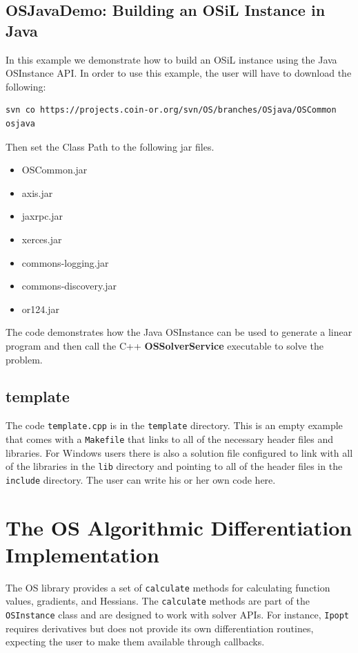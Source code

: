 \documentclass[11pt]{article}
\renewcommand{\_}{{\char"5F}}
\renewcommand{\{}{{\char"7B}}
\renewcommand{\}}{{\char"7D}}
\renewcommand{\^}{{\char"0D}}
\renewcommand{\'}{{\char"0D}}
\begin{document}
\begin{enumerate}[Step 1:]
\subsection{OSJavaDemo:  Building an OSiL Instance in Java}\label{section:exampleOSJavaDemo}

In this example we demonstrate how to build an OSiL instance using the Java OSInstance API. In order to use this example, the user will have to download the following:

\begin{verbatim}
svn co https://projects.coin-or.org/svn/OS/branches/OSjava/OSCommon osjava
\end{verbatim}
Then set the Class Path to the following jar files.
\begin{itemize}
\item OSCommon.jar
\item axis.jar
\item jaxrpc.jar
\item xerces.jar
\item commons-logging.jar
\item commons-discovery.jar
\item or124.jar
\end{itemize}
The code demonstrates how the Java OSInstance can be used to generate a linear program and then call the  
C++ {  \bf OSSolverService} executable to solve the problem.



\subsection{template}\label{section:exampleTemplate} The code {\tt template.cpp} is in the {\tt template} 
directory.  This is an empty example that comes with a {\tt Makefile}  that links to all of the necessary 
header files and libraries. For Windows users there is also a solution file configured to link with all
of the libraries in the {\tt lib} directory and pointing to all of the header files in the {\tt include} directory.
The user can write his or her own code here.






\section{The OS Algorithmic Differentiation Implementation}\label{section:ad}

The OS library provides a set of {\tt calculate} methods for calculating  function values, gradients, and Hessians.
The {\tt calculate} methods are part of the {\tt OSInstance} class and are designed to work with solver APIs.
For instance, {\tt Ipopt} requires derivatives but does not provide its own differentiation routines, 
expecting the user to make them available through callbacks.



\end{enumerate}
\end{document}
